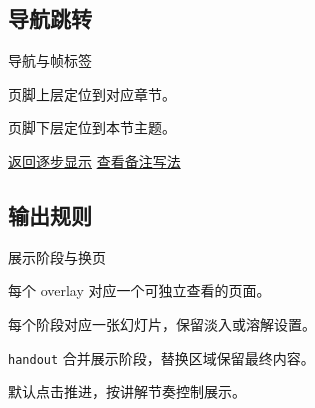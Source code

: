 \subsection{导航跳转}
\begin{frame}{导航与帧标签}
  \begin{description}[小节跳转]
    \item[章节跳转] 页脚上层定位到对应章节。
    \item[小节跳转] 页脚下层定位到本节主题。
    \item[帧内标签] \hyperlink{demo-reveal}{返回逐步显示}\quad
      \hyperlink{demo-notes}{查看备注写法}
  \end{description}
\end{frame}

\subsection{输出规则}
\begin{frame}{展示阶段与换页}
  \begin{description}[PPTX 换页]
    \item[PDF 阶段] 每个 overlay 对应一个可独立查看的页面。
    \item[PPTX 换页] 每个阶段对应一张幻灯片，保留淡入或溶解设置。
    \item[讲义版本] \texttt{handout} 合并展示阶段，替换区域保留最终内容。
  \end{description}
  \medskip
  默认点击推进，按讲解节奏控制展示。
\end{frame}
